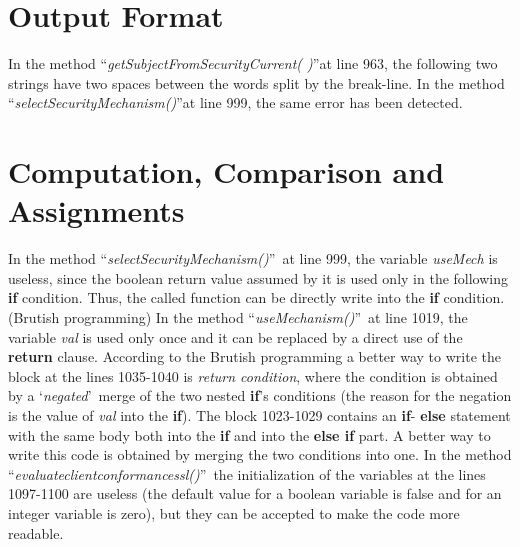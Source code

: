 \documentclass[\mainpath/main]{subfiles}
\begin{document}
\section{Output Format}
\label{CodeInspectionChecklist:OutputFormat}
In the method \textquotedblleft \textit{getSubjectFromSecurityCurrent( )}\textquotedblright at line 963, the following two strings have two spaces between the words split by the break-line.
In the method \textquotedblleft \textit{selectSecurityMechanism(\textellipsis)}\textquotedblright at line 999, the same error has been detected.

\section{Computation, Comparison and Assignments}
\label{CodeInspectionChecklist:ComputationComparisonandAssignments}
In the method \textquotedblleft \textit{selectSecurityMechanism(\textellipsis)}\textquotedblright\ at line 999, the variable \textit{useMech} is useless, since the boolean return value assumed by it is used only in the following \textbf{\color{javapurple} if} condition. Thus, the called function can be directly write into the \textbf{\color{javapurple} if} condition. (Brutish programming)
In the method \textquotedblleft \textit{useMechanism(\textellipsis)}\textquotedblright\ at line 1019, the variable \textit{val} is used only once and it can be replaced by a direct use of the \textbf{\color{javapurple} return} clause. According to the Brutish programming a better way to write the block at the lines 1035-1040 is \textit{return condition}, where the condition is obtained by a \textquoteleft \textit{negated}\textquoteright\ merge of the two nested \textbf{\color{javapurple} if}'s conditions (the reason for the negation is the value of \textit{val} into the \textbf{\color{javapurple} if}).
The block 1023-1029 contains an \textbf{\color{javapurple} if}-\textbf{\color{javapurple} else} statement with the same body both into the \textbf{\color{javapurple} if} and into the \textbf{\color{javapurple} else if} part. A better way to write this code is obtained by merging the two conditions into one.
In the method \textquotedblleft \textit{evaluate\textunderscore client\textunderscore conformance\textunderscore ssl(\textellipsis)}\textquotedblright\ the initialization of the variables at the lines 1097-1100 are useless (the default value for a boolean variable is false and for an integer variable is zero), but they can be accepted to make the code more readable.\\
\end{document}
